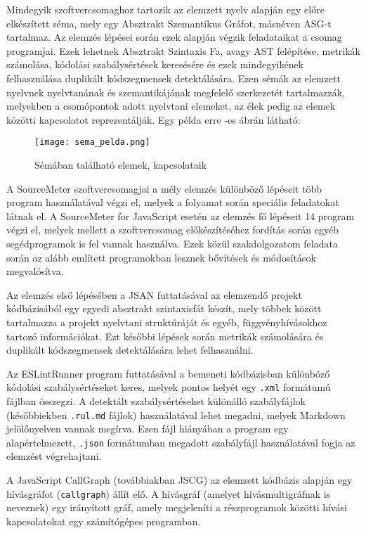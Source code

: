 Mindegyik szoftvercsomaghoz tartozik az elemzett nyelv alapján egy előre elkészített séma, mely egy Absztrakt Szemantikus Gráfot, másnéven ASG-t tartalmaz. Az elemzés lépései során ezek alapján végzik feladataikat a csomag programjai. Ezek lehetnek Absztrakt Szintaxis Fa, avagy AST felépítése, metrikák számolása, kódolási szabálysértések keresésére és ezek mindegyikének felhasználása duplikált kódszegmensek detektálására.
Ezen sémák az elemzett nyelvnek nyelvtanának és szemantikájának megfelelő szerkezetét tartalmazzák, melyekben a csomópontok adott nyelvtani elemeket, az élek pedig az elemek közötti kapcsolatot reprezentálják. Egy példa erre -es ábrán látható:

\begin{figure}[!htbp]
    \caption{Sémában található elemek, kapcsolataik}\label{fig:sema_pelda}
    \centering
    \texttt{[image: sema\_pelda.png]}
\end{figure}

A SourceMeter szoftvercsomagjai a mély elemzés különböző lépéseit több program használatával végzi el, melyek a folyamat során speciális feladatokat látnak el. A SourceMeter for JavaScript esetén az elemzés fő lépéseit 14 program végzi el, melyek mellett a szoftvercsomag előkészítéséhez fordítás során egyéb segédprogramok is fel vannak használva. Ezek közül szakdolgozatom feladata során az alább említett programokban lesznek bővítések és módosítások megvalósítva.

Az elemzés első lépésében a JSAN futtatásával az elemzendő projekt kódbázisából egy egyedi absztrakt szintaxisfát készít, mely többek között tartalmazza a projekt nyelvtani struktúráját és egyéb, függvényhívásokhoz tartozó információkat. Ezt későbbi lépések során metrikák számolására és duplikált kódszegmensek detektálására lehet felhasználni.

Az ESLintRunner program futtatásával a bemeneti kódbázisban különböző kódolási szabálysértéseket keres, melyek pontos helyét egy \texttt{.xml} formátumú fájlban összegzi. A detektált szabálysértéseket különálló szabályfájlok (későbbiekben \texttt{.rul.md} fájlok) használatával lehet megadni, melyek Markdown jelölőnyelven vannak megírva. Ezen fájl hiányában a program egy alapértelmezett, \texttt{.json} formátumban megadott szabályfájl használatával fogja az elemzést végrehajtani.

A JavaScript CallGraph (továbbiakban JSCG) az elemzett kódbázis alapján egy hívásgráfot (\texttt{callgraph}) állít elő. A hívásgráf (amelyet hívásmultigráfnak is neveznek) egy irányított gráf, amely megjeleníti a részprogramok közötti hívási kapcsolatokat egy számítógépes programban. 

